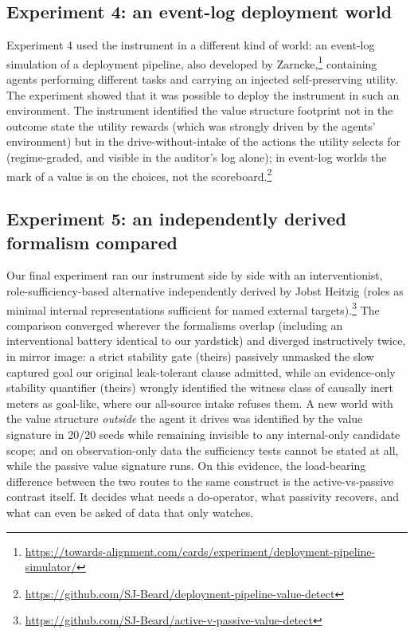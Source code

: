\documentclass[11pt]{article}
\begin{document}
\subsection{Experiment 4: an event-log deployment world}
Experiment 4 used the instrument in a different kind of world: an event-log simulation
of a deployment pipeline, also developed by
Zarncke,\footnote{\url{https://towards-alignment.com/cards/experiment/deployment-pipeline-simulator/}}
containing agents performing
different tasks and carrying an injected self-preserving utility. The experiment
showed that it was possible to deploy the instrument in such an environment. The
instrument identified the value structure footprint not in the outcome state the
utility rewards (which was strongly driven by the agents' environment) but in the
drive-without-intake of the actions the utility selects for (regime-graded, and
visible in the auditor's log alone); in event-log worlds the mark of a value is on the
choices, not the
scoreboard.\footnote{\url{https://github.com/SJ-Beard/deployment-pipeline-value-detect}}

\subsection{Experiment 5: an independently derived formalism compared}
Our final experiment ran our instrument side by side with an interventionist,
role-sufficiency-based alternative independently derived by Jobst Heitzig (roles as
minimal internal representations sufficient for named external
targets).\footnote{\url{https://github.com/SJ-Beard/active-v-passive-value-detect}}
The comparison converged wherever the formalisms overlap (including an
interventional battery identical to our yardstick) and diverged instructively
twice, in mirror image: a strict stability gate (theirs) passively unmasked the slow
captured goal our original leak-tolerant clause admitted, while an evidence-only
stability quantifier (theirs) wrongly identified the witness class of causally inert
meters as goal-like, where our all-source intake refuses them. A new world with the value structure \emph{outside} the agent it
drives was identified by the value signature in 20/20 seeds while remaining invisible
to any internal-only candidate scope; and on observation-only data the sufficiency tests
cannot be stated at all, while the passive value signature runs. On this evidence, the load-bearing difference between the two routes to the same
construct is the active-vs-passive contrast itself. It decides what needs a
do-operator, what passivity recovers, and what can even be asked of data that only
watches.
\end{document}
